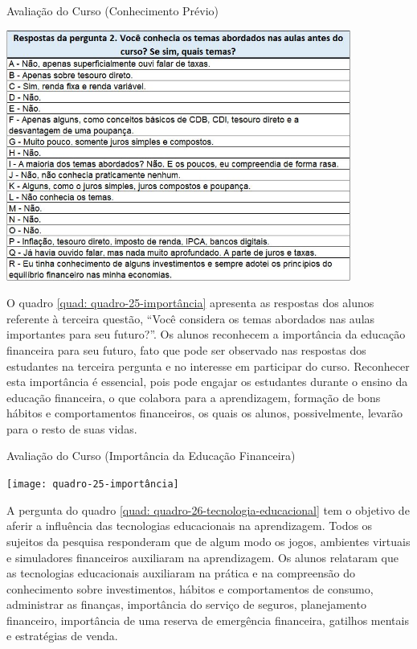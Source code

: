\graphicspath{{quadros/}} 
\begin{quadro}[!ht]
\centering
\begin{minipage}{0.8\textwidth}
\caption{Avaliação do Curso (Conhecimento Prévio)}
\centering
\includegraphics[width=0.85\textwidth]{quadro-24-conhecimento}
\label{quad: quadro-24-conhecimento}
\end{minipage}
\end{quadro}

O quadro \ref{quad: quadro-25-importância} apresenta as respostas dos alunos referente à terceira questão, “Você considera os temas abordados nas aulas importantes para seu futuro?”. Os alunos reconhecem a importância da educação financeira para seu futuro, fato que pode ser observado nas respostas dos estudantes na terceira pergunta e no interesse em participar do curso. Reconhecer esta importância é essencial, pois pode engajar os estudantes durante o ensino da educação financeira, o que colabora para a aprendizagem, formação de bons hábitos e comportamentos financeiros, os quais os alunos, possivelmente, levarão para o resto de suas vidas.

\graphicspath{{quadros/}} 
\begin{quadro}[!ht]
\centering
\begin{minipage}{0.8\textwidth}
\caption{Avaliação do Curso (Importância da Educação Financeira)}
\centering
\texttt{[image: quadro-25-importância]}
\label{quad: quadro-25-importância}
\end{minipage}
\end{quadro}

A pergunta do quadro \ref{quad: quadro-26-tecnologia-educacional} tem o objetivo de aferir a influência das tecnologias educacionais na aprendizagem. Todos os sujeitos da pesquisa responderam que de algum modo os jogos, ambientes virtuais e simuladores financeiros auxiliaram na aprendizagem. Os alunos relataram que as tecnologias educacionais auxiliaram na prática e na compreensão do conhecimento sobre investimentos, hábitos e comportamentos de consumo, administrar as finanças, importância do serviço de seguros, planejamento financeiro, importância de uma reserva de emergência financeira, gatilhos mentais e estratégias de venda.

